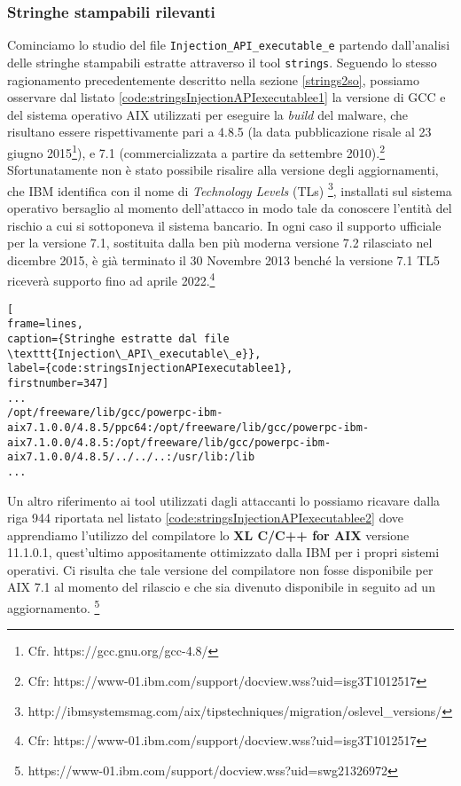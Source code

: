 \documentclass[10pt,a4paper, titlepage]{report}
\begin{document}
\subsubsection{Stringhe stampabili rilevanti}

Cominciamo lo studio del file \texttt{Injection\_API\_executable\_e} partendo dall'analisi delle stringhe stampabili estratte attraverso il tool \texttt{strings}.
Seguendo lo stesso ragionamento precedentemente descritto nella sezione \ref{strings2so}, possiamo osservare dal listato \ref{code:stringsInjectionAPIexecutablee1} la versione di GCC e del sistema operativo AIX utilizzati per eseguire la \textit{build} del malware, che risultano essere rispettivamente pari a 4.8.5 (la data pubblicazione risale al 23 giugno 2015\footnote{Cfr. https://gcc.gnu.org/gcc-4.8/}), e 7.1 (commercializzata a partire da settembre 2010).\footnote{Cfr: https://www-01.ibm.com/support/docview.wss?uid=isg3T1012517}
Sfortunatamente non è stato possibile risalire alla versione degli aggiornamenti, che IBM identifica con il nome di \textit{Technology Levels} (TLs) \footnote{http://ibmsystemsmag.com/aix/tipstechniques/migration/oslevel\_versions/}, installati sul sistema operativo bersaglio al momento dell'attacco in modo tale da conoscere l'entità del rischio a cui si sottoponeva il sistema bancario. In ogni caso il supporto ufficiale per la versione 7.1, sostituita dalla ben più moderna versione 7.2 rilasciato nel dicembre 2015, è già terminato il 30 Novembre 2013 benché la versione 7.1 TL5 riceverà supporto fino ad aprile 2022.\footnote{Cfr: https://www-01.ibm.com/support/docview.wss?uid=isg3T1012517}

\begin{lstlisting}[
frame=lines, 
caption={Stringhe estratte dal file \texttt{Injection\_API\_executable\_e}}, 
label={code:stringsInjectionAPIexecutablee1},
firstnumber=347]
...
/opt/freeware/lib/gcc/powerpc-ibm-aix7.1.0.0/4.8.5/ppc64:/opt/freeware/lib/gcc/powerpc-ibm-aix7.1.0.0/4.8.5:/opt/freeware/lib/gcc/powerpc-ibm-aix7.1.0.0/4.8.5/../../..:/usr/lib:/lib
...
\end{lstlisting}

Un altro riferimento ai tool utilizzati dagli attaccanti lo possiamo ricavare dalla riga 944 riportata nel listato \ref{code:stringsInjectionAPIexecutablee2} dove apprendiamo l'utilizzo del compilatore lo \textbf{XL C/C++ for AIX} versione 11.1.0.1, quest'ultimo appositamente ottimizzato dalla IBM per i propri sistemi operativi. Ci risulta che tale versione del compilatore non fosse disponibile per AIX 7.1 al momento del rilascio e che sia divenuto disponibile in seguito ad un aggiornamento. \footnote{https://www-01.ibm.com/support/docview.wss?uid=swg21326972}
\end{document}
